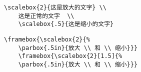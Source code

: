 \hspace{-1.5cm}\begin{minipage}[b]{.5\textwidth}
	\begin{center}
	\end{center}
	\par\vspace{0pt}
\end{minipage}%
\begin{minipage}[b]{.5\textwidth}
	\begin{Verbatim}[formatcom=\color{VerbatimColor}\CJKfamily{kai}]
	\scalebox{2}{这是放大的文字} \\
	这是正常的文字  \\
	\scalebox{.5}{这是缩小的文字}
	\end{Verbatim}
	\par\vspace{0pt}
\end{minipage}

\hspace{-1.5cm}\begin{minipage}[b]{.5\textwidth}
	\par\vspace{0pt}
\end{minipage}%
\begin{minipage}[b]{.5\textwidth}
	\begin{Verbatim}[formatcom=\color{VerbatimColor}\CJKfamily{kai}]
	\framebox{\scalebox{2}{%
	\parbox{.5in}{放大 \\ 和 \\ 缩小}}}
	\framebox{\scalebox{2}[1.5]{%
	\parbox{.5in}{放大 \\ 和 \\ 缩小}}}
	\end{Verbatim}
	\par\vspace{0pt}
\end{minipage}

